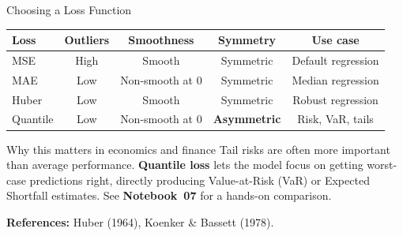 \documentclass[aspectratio=169,11pt]{beamer}
\begin{document}
\begin{frame}[shrink=10]{Choosing a Loss Function}
\begin{center}
{\small
\renewcommand{\arraystretch}{1.4}
\begin{tabular}{lcccc}
\toprule
\textbf{Loss} & \textbf{Outliers} & \textbf{Smoothness} & \textbf{Symmetry} & \textbf{Use case} \\
\midrule
MSE      & High & Smooth          & Symmetric           & Default regression \\
MAE      & Low  & Non-smooth at 0 & Symmetric           & Median regression \\
Huber    & Low  & Smooth          & Symmetric           & Robust regression \\
Quantile & Low  & Non-smooth at 0 & \textbf{Asymmetric} & Risk, VaR, tails \\
\bottomrule
\end{tabular}
}%
\end{center}

\vspace{0.5cm}
\begin{alertblock}{Why this matters in economics and finance}
Tail risks are often more important than average performance.
\textbf{Quantile loss} lets the model focus on getting worst-case predictions right,
directly producing Value-at-Risk (VaR) or Expected Shortfall estimates.
See \textbf{Notebook~07} for a hands-on comparison.
\end{alertblock}

\vspace{0.2cm}
{\small \textbf{References:} Huber (1964), Koenker \& Bassett (1978).}
\end{frame}
\end{document}
